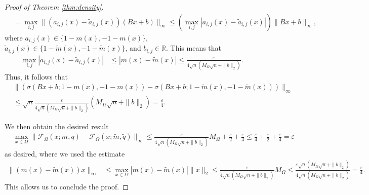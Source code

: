 \documentclass[10pt,a4paper]{amsart}
\begin{document}
\begin{proof}[Proof of Theorem \ref{thm:density}]
\[\begin{split}
&= \max_{i,j} \|(a_{i,j}(x)-\widetilde{a}_{i,j}(x))(Bx+b)\|_\infty\leq \left(\max_{i,j} |a_{i,j}(x)-\widetilde{a}_{i,j}(x)|\right )\|Bx+b\|_\infty ,
\end{split}
\]
where $a_{i,j}(x)\in\{1-m(x),-1-m(x)\}$, $\widetilde{a}_{i,j}(x)\in\{1-\widetilde{m}(x),-1-\widetilde{m}(x)\}$, and $b_{i,j}\in\mathbb{R}$. This means that
\[
\begin{aligned}
\max_{i,j}|a_{i,j}(x)-\widetilde{a}_{i,j}(x)| & \leq |m(x)-\widetilde{m}(x)|\leq \frac{\varepsilon}{4\sqrt{n}(M_{\Omega}\sqrt{n}+\|b\|_2)}.
\end{aligned}
\]
Thus, it follows that
\[
\begin{aligned}
&\|\left(\sigma(Bx+b;1-m(x),-1-m(x)) -\sigma(Bx+b;1-\widetilde{m}(x),-1-\widetilde{m}(x))\right)\|_\infty\\
&\leq \sqrt{n} \frac{\varepsilon}{4\sqrt{n}(M_\Omega\sqrt{n}+\|b\|_2)}(M_\Omega\sqrt{n}+\|b\|_2) = \frac{\varepsilon}{4}.
\end{aligned}
\]

We then obtain the desired result
\[
\begin{aligned}
&\max_{x\in\Omega}\|\mathcal{F}_{\Omega}(x;m,q)-\mathcal{F}_\Omega(x;\widetilde{m},\widetilde{q})\|_\infty\leq \frac{\varepsilon}{4\sqrt{n}(M_\Omega\sqrt{n} + \|b\|_2)}M_\Omega + \frac{\varepsilon}{2} + \frac{\varepsilon}{4}\leq \frac{\varepsilon}{4} + \frac{\varepsilon}{2} + \frac{\varepsilon}{4} = \varepsilon
\end{aligned}
\]
as desired, where we used the estimate
\[
\begin{split}
\|(m(x)-\widetilde{m}(x))x\|_\infty &\leq \max_{x\in\Omega}|m(x)-\widetilde{m}(x)| \|x\|_2\leq \frac{\varepsilon}{4\sqrt{n}(M_\Omega\sqrt{n} + \|b\|_2)}M_\Omega\leq \frac{\varepsilon \sqrt{n}(M_\Omega\sqrt{n}+\|b\|_2)}{4\sqrt{n}(M_\Omega\sqrt{n} + \|b\|_2)} = \frac{\varepsilon}{4}.
\end{split}
\]
This allows us to conclude the proof.
\end{proof}
\end{document}
